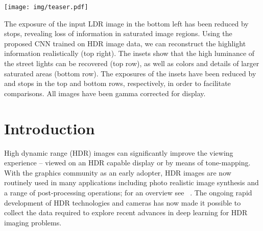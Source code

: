 \documentclass[acmtog]{acmart}
\begin{document}


\begin{teaserfigure}
	\centering
    \texttt{[image: img/teaser.pdf]}
    \caption{The exposure of the input LDR image in the bottom left has been reduced by  stops, revealing loss of information in saturated image regions. Using the proposed CNN trained on HDR image data, we can reconstruct the highlight information realistically (top right). The insets show that the high luminance of the street lights can be recovered (top row), as well as colors and details of larger saturated areas (bottom row). The exposures of the insets have been reduced by  and  stops in the top and bottom rows, respectively, in order to facilitate comparisons. All images have been gamma corrected for display.}
    \label{fig:teaser}
\end{teaserfigure}

\maketitle



\section{Introduction}

High dynamic range (HDR) images can significantly improve the viewing experience -- viewed on an HDR capable display or by means of tone-mapping. With the graphics community as an early adopter, HDR images are now routinely used in many applications including photo realistic image synthesis and a range of post-processing operations; for an overview see ~\cite{Reinhard2010,Banterle2011,Dufaux2016}. The ongoing rapid development of HDR technologies and cameras has now made it possible to collect the data required to explore recent advances in deep learning for HDR imaging problems.
\end{document}
